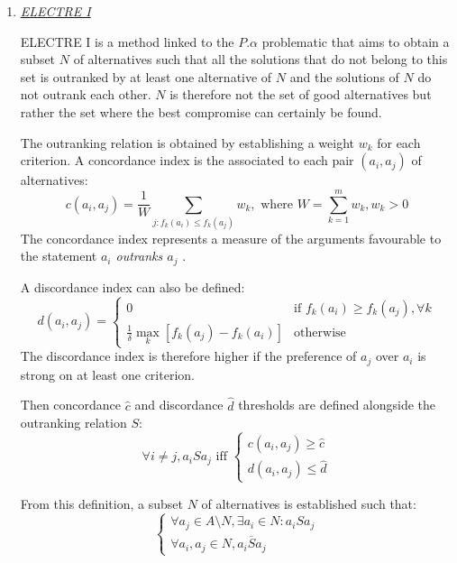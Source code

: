 \begin{enumerate}
\item \textit{\underline{ELECTRE I}}

ELECTRE I is a method linked to the $P.\alpha$ problematic that aims to obtain a subset $N$ of alternatives such that all the solutions that do not belong to this set is outranked by at least one alternative of $N$ and the solutions of $N$ do not outrank each other. $N$ is therefore not the set of good alternatives but rather the set where the best compromise can certainly be found.

The outranking relation is obtained by establishing a weight $w_k$ for each criterion. A concordance index is the associated to each pair $(a_i, a_j)$ of alternatives:
\begin{equation}
c(a_i, a_j) = \frac{1}{W} \sum_{j:f_{k}(a_i) \leq f_{k}(a_j)}{w_{k}}, \text{ where } W = \sum_{k=1}^{m} w_{k}, w_k > 0
\end{equation}
The concordance index represents a measure of the arguments favourable to the statement \og \textit{$a_i$ outranks $a_j$} \fg.

A discordance index can also be defined:
\begin{equation}
d(a_i, a_j) = \begin{cases}
	0& \text{if $f_{k}(a_i) \geq f_{k}(a_j), \forall k$}\\
	\frac{1}{\delta} \max_{k} [f_{k}(a_j) - f_{k}(a_i)]& \text{otherwise}
	\end{cases}
\end{equation}
The discordance index is therefore higher if the preference of $a_j$ over $a_i$ is strong on at least one criterion.

Then concordance $\hat{c}$ and discordance $\hat{d}$ thresholds are defined alongside the outranking relation $S$:
\begin{equation}
\forall i \neq j, a_iSa_j \text{ iff } \begin{cases}
	c(a_i, a_j) \geq \hat{c}\\
	d(a_i, a_j) \leq \hat{d}
	\end{cases}
\end{equation}

From this definition, a subset $N$ of alternatives is established such that:
\begin{equation}
\begin {cases}
\forall a_j \in A\setminus N, \exists a_i \in N : a_iSa_j\\
\forall a_i, a_j \in N, a_i \overline{S} a_j
\end{cases}
\end{equation}


\end{enumerate}
